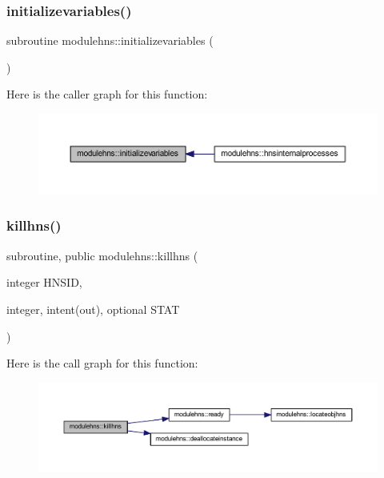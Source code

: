 \subsubsection{\texorpdfstring{initializevariables()}{initializevariables()}}
{\footnotesize\ttfamily subroutine modulehns\+::initializevariables (\begin{DoxyParamCaption}{ }\end{DoxyParamCaption})\hspace{0.3cm}{\ttfamily [private]}}

Here is the caller graph for this function\+:\nopagebreak
\begin{figure}[H]
\begin{center}
\leavevmode
\includegraphics[width=350pt]{namespacemodulehns_a23256714b2ab17223f430aced19cdda8_icgraph}
\end{center}
\end{figure}
\mbox{\label{namespacemodulehns_ae9cbb1085170907acb10a56c08c0a669}} 
\subsubsection{\texorpdfstring{killhns()}{killhns()}}
{\footnotesize\ttfamily subroutine, public modulehns\+::killhns (\begin{DoxyParamCaption}\item[{integer}]{H\+N\+S\+ID,  }\item[{integer, intent(out), optional}]{S\+T\+AT }\end{DoxyParamCaption})}

Here is the call graph for this function\+:\nopagebreak
\begin{figure}[H]
\begin{center}
\leavevmode
\includegraphics[width=350pt]{namespacemodulehns_ae9cbb1085170907acb10a56c08c0a669_cgraph}
\end{center}
\end{figure}
\mbox{\label{namespacemodulehns_aff869b6b5dffbe4b2d00b777a1c0455d}} 
